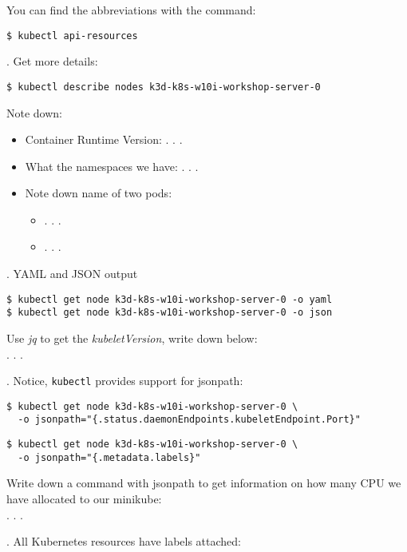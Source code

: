 \documentclass[12pt, letterpaper]{article}
\begin{document}
You can find the abbreviations with the command:

\begin{verbatim}
$ kubectl api-resources
\end{verbatim}

. Get more details:

\begin{verbatim}
$ kubectl describe nodes k3d-k8s-w10i-workshop-server-0
\end{verbatim}

Note down:
\begin{itemize}
    \item Container Runtime Version: . . .
    \item  What the namespaces we have: . . .
    \item  Note down name of two pods:\begin{itemize}
        \item . . .
        \item . . .
     \end{itemize}
\end{itemize}

. YAML and JSON output

\begin{verbatim}
$ kubectl get node k3d-k8s-w10i-workshop-server-0 -o yaml
$ kubectl get node k3d-k8s-w10i-workshop-server-0 -o json
\end{verbatim}

Use \textit{jq} to get the \textit{kubeletVersion}, write down below:
\\

   . . .

. Notice, \verb|kubectl| provides support for jsonpath:

\begin{verbatim}
$ kubectl get node k3d-k8s-w10i-workshop-server-0 \
  -o jsonpath="{.status.daemonEndpoints.kubeletEndpoint.Port}"
\end{verbatim}

\begin{verbatim}
$ kubectl get node k3d-k8s-w10i-workshop-server-0 \
  -o jsonpath="{.metadata.labels}"
\end{verbatim}

Write down a command with jsonpath to get information on how many CPU we have allocated to our minikube:
\\

   . . .


. All Kubernetes resources have labels attached:
\end{document}

